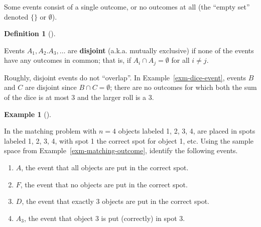 \documentclass[
  letterpaper,
  DIV=11,
  numbers=noendperiod]{scrreprt}
\providecommand{\tightlist}{%
  \setlength{\itemsep}{0pt}\setlength{\parskip}{0pt}}
\theoremstyle{plain}
\theoremstyle{definition}
\newtheorem{example}{Example}[chapter]
\theoremstyle{definition}
\theoremstyle{definition}
\newtheorem{definition}{Definition}[chapter]
\theoremstyle{remark}
\begin{document}
Some events consist of a single outcome, or no outcomes at all (the
``empty set'' denoted \(\{\}\) or \(\emptyset\)).

\begin{definition}[]\protect\hypertarget{def-disjoint-events}{}\label{def-disjoint-events}

Events \(A_1, A_2. A_3, \ldots\) are \textbf{disjoint}
(a.k.a. mutually exclusive) if none of the events have any outcomes in
common; that is, if \(A_i \cap A_j = \emptyset\) for all \(i\neq j\).

\end{definition}

Roughly, disjoint events do not ``overlap''. In
Example~\ref{exm-dice-event}, events \(B\) and \(C\) are disjoint since
\(B \cap C = \emptyset\); there are no outcomes for which both the sum
of the dice is at most 3 and the larger roll is a 3.

\begin{tcolorbox}[enhanced jigsaw, opacityback=0, left=2mm, colframe=quarto-callout-note-color-frame, toprule=.15mm, breakable, colback=white, leftrule=.75mm, arc=.35mm, rightrule=.15mm, bottomrule=.15mm]

\begin{example}[]\protect\hypertarget{exm-matching-event}{}\label{exm-matching-event}

In the matching problem with \(n=4\) objects labeled 1, 2, 3, 4, are
placed in spots labeled 1, 2, 3, 4, with spot 1 the correct spot for
object 1, etc. Using the sample space from
Example~\ref{exm-matching-outcome}, identify the following events.

\begin{enumerate}
\def\labelenumi{\arabic{enumi}.}
\tightlist
\item
  \(A\), the event that all objects are put in the correct spot.
\item
  \(F\), the event that no objects are put in the correct spot.
\item
  \(D\), the event that exactly 3 objects are put in the correct spot.
\item
  \(A_3\), the event that object 3 is put (correctly) in spot 3.
\end{enumerate}

\end{example}

\end{tcolorbox}
\end{document}
